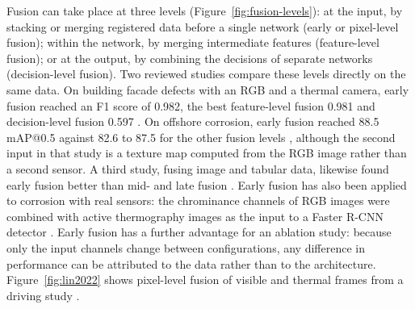 Fusion can take place at three levels (Figure~\ref{fig:fusion-levels}): at the input, by stacking or merging registered data before
a single network (early or pixel-level fusion); within the network, by merging
intermediate features (feature-level fusion); or at the output, by combining the
decisions of separate networks (decision-level fusion). Two reviewed studies
compare these levels directly on the same data. On building facade defects with
an RGB and a thermal camera, early fusion reached an F1 score of 0.982, the best
feature-level fusion 0.981 and decision-level fusion 0.597 \citep{Yang2023}. On offshore
corrosion, early fusion reached 88.5 mAP@0.5 against 82.6 to 87.5 for the other
fusion levels \citep{Mao2026}, although the second input in that study is a texture map
computed from the RGB image rather than a second sensor. A third study, fusing
image and tabular data, likewise found early fusion better than mid- and late
fusion \citep{Chowdhury2026}. Early fusion has also been applied to corrosion with real sensors:
the chrominance channels of RGB images were combined with active thermography
images as the input to a Faster R-CNN detector \citep{Lim2021}. Early fusion has a further
advantage for an ablation study: because only the input channels change between
configurations, any difference in performance can be attributed to the data
rather than to the architecture. Figure~\ref{fig:lin2022} shows pixel-level fusion of visible
and thermal frames from a driving study \citep{Lin2022}.



